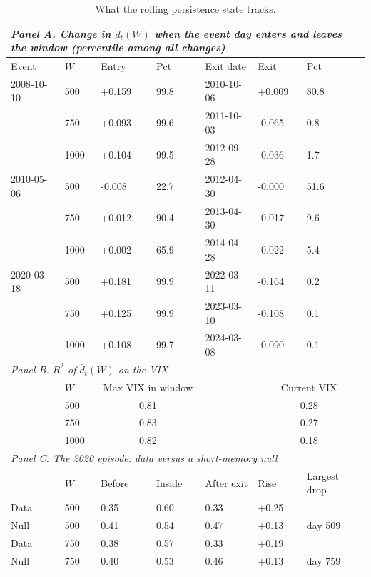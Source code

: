 \begin{table}[H]
\caption{What the rolling persistence state tracks.}
\label{tab:window}
\footnotesize
\begin{tabularx}{\textwidth}{lXXXXXX}
\toprule
\multicolumn{7}{l}{\textit{Panel A. Change in $\bar d_t(W)$ when the event day enters and leaves the window (percentile among all changes)}} \\
\midrule
Event & $W$ & Entry & Pct & Exit date & Exit & Pct \\
\midrule
2008-10-10 & 500 & +0.159 & 99.8 & 2010-10-06 & +0.009 & 80.8 \\
 & 750 & +0.093 & 99.6 & 2011-10-03 & -0.065 & 0.8 \\
 & 1000 & +0.104 & 99.5 & 2012-09-28 & -0.036 & 1.7 \\
2010-05-06 & 500 & -0.008 & 22.7 & 2012-04-30 & -0.000 & 51.6 \\
 & 750 & +0.012 & 90.4 & 2013-04-30 & -0.017 & 9.6 \\
 & 1000 & +0.002 & 65.9 & 2014-04-28 & -0.022 & 5.4 \\
2020-03-18 & 500 & +0.181 & 99.9 & 2022-03-11 & -0.164 & 0.2 \\
 & 750 & +0.125 & 99.9 & 2023-03-10 & -0.108 & 0.1 \\
 & 1000 & +0.108 & 99.7 & 2024-03-08 & -0.090 & 0.1 \\
\midrule
\multicolumn{7}{l}{\textit{Panel B. $R^2$ of $\bar d_t(W)$ on the VIX}} \\
\midrule
& $W$ & \multicolumn{2}{c}{Max VIX in window} & & \multicolumn{2}{c}{Current VIX} \\
\midrule
& 500 & \multicolumn{2}{c}{0.81} & & \multicolumn{2}{c}{0.28} \\
& 750 & \multicolumn{2}{c}{0.83} & & \multicolumn{2}{c}{0.27} \\
& 1000 & \multicolumn{2}{c}{0.82} & & \multicolumn{2}{c}{0.18} \\
\midrule
\multicolumn{7}{l}{\textit{Panel C. The 2020 episode: data versus a short-memory null}} \\
\midrule
& $W$ & Before & Inside & After exit & Rise & Largest drop \\
\midrule
Data & 500 & 0.35 & 0.60 & 0.33 & +0.25 & \\
Null & 500 & 0.41 & 0.54 & 0.47 & +0.13 & day 509 \\
Data & 750 & 0.38 & 0.57 & 0.33 & +0.19 & \\
Null & 750 & 0.40 & 0.53 & 0.46 & +0.13 & day 759 \\

\end{tabularx}
\end{table}
